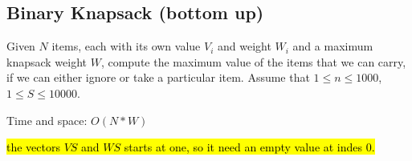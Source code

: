 \subsection{Binary Knapsack (bottom up)}

Given $N$ items, each with its own value $V_i$ and weight $W_i$ and a maximum knapsack weight $W$, compute the maximum value of the items that we can carry, if we can either ignore or take a particular item. Assume that $1 \leq n \leq 1000$, $1 \leq S \leq 10 000$.

Time and space: $O(N*W)$

\hl{the vectors $VS$ and $WS$ starts at one, so it need an empty value at indes 0.}
